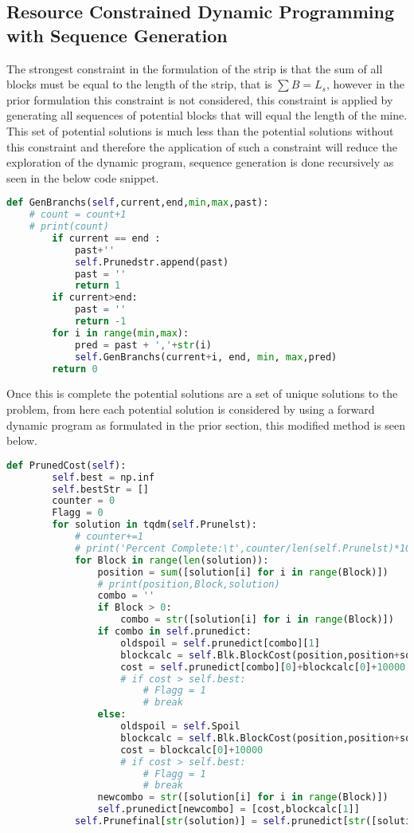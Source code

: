 \subsection{Resource Constrained Dynamic Programming with Sequence Generation}
The strongest constraint in the formulation of the strip is that the sum of all blocks must be equal to the length of the strip, that is $\sum B = L_s$, however in the prior formulation this constraint is not considered, this constraint is applied by generating all sequences of potential blocks that will equal the length of the mine. This set of potential solutions is much less than the potential solutions without this constraint and therefore the application of such a constraint will reduce the exploration of the dynamic program, sequence generation is done recursively as seen in the below code snippet. 
\begin{lstlisting}[language = python]
def GenBranchs(self,current,end,min,max,past):
	# count = count+1
	# print(count)
		if current == end :
			past+''
			self.Prunedstr.append(past)
			past = ''
			return 1
		if current>end:
			past = ''
			return -1
		for i in range(min,max):
			pred = past + ','+str(i)
			self.GenBranchs(current+i, end, min, max,pred)
		return 0
\end{lstlisting}
Once this is complete the potential solutions are a set of unique solutions to the problem, from here each potential solution is considered by using a forward dynamic program as formulated in the prior section, this modified method is seen below. 
\begin{lstlisting}[language = python]
def PrunedCost(self):
		self.best = np.inf
		self.bestStr = []
		counter = 0
		Flagg = 0
		for solution in tqdm(self.Prunelst):
			# counter+=1
			# print('Percent Complete:\t',counter/len(self.Prunelst)*100,'%')
			for Block in range(len(solution)):
				position = sum([solution[i] for i in range(Block)])
				# print(position,Block,solution)
				combo = ''
				if Block > 0:
					combo = str([solution[i] for i in range(Block)])
				if combo in self.prunedict:
					oldspoil = self.prunedict[combo][1]
					blockcalc = self.Blk.BlockCost(position,position+solution[Block],oldspoil)
					cost = self.prunedict[combo][0]+blockcalc[0]+10000
					# if cost > self.best:
						# Flagg = 1
						# break
				else:
					oldspoil = self.Spoil
					blockcalc = self.Blk.BlockCost(position,position+solution[Block],oldspoil)
					cost = blockcalc[0]+10000
					# if cost > self.best:
						# Flagg = 1
						# break
				newcombo = str([solution[i] for i in range(Block)])
				self.prunedict[newcombo] = [cost,blockcalc[1]]
			self.Prunefinal[str(solution)] = self.prunedict[str([solution[i] for i in range(Block)])]

\end{lstlisting}
